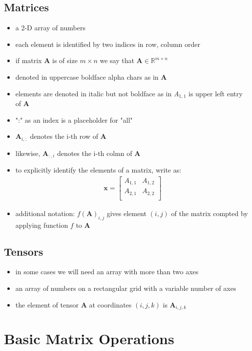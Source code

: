 \documentclass[11pt,twocolumn]{report}
\def\realnumbers{\mathbb{R}}
\begin{document}
\subsection{Matrices}
\begin{itemize}
  \item a 2-D array of numbers
  \item each element is identified by two indices in row, column order
  \item if matrix $\bm{A}$ is of size $m \times n$ we say that $\bm{A} \in
    \realnumbers^{m \times n}$
  \item denoted in uppercase boldface alpha chars as in $\bm{A}$
  \item elements are denoted in italic but not boldface as in
    \textit{A}$_{1,1}$ is upper left entry of $\bm{A}$
  \item ":" as an index is a placeholder for "all"
  \item $\bm{A}_{i,:}$ denotes the i-th row of $\bm{A}$
  \item likewise, $\bm{A}_{:,i}$ denotes the i-th colmn of $\bm{A}$
  \item to explicitly identify the elements of a matrix, write as:
    \begin{gather}
      \bm{x} = 
      \begin{bmatrix}
        A_{1,1} & A_{1, 2}\\
        A_{2,1} & A_{2, 2}\\
      \end{bmatrix}
    \end{gather}
  \item additional notation: $f(\bm{A})_{i, j}$ gives element $(i, j)$ of the
    matrix compted by applying function $f$ to $\bm{A}$
\end{itemize}

\subsection{Tensors}
\begin{itemize}
  \item in some cases we will need an array with more than two axes
  \item an array of numbers on a rectangular grid with a variable number of axes
  \item the element of tensor $\bm{A}$ at coordinates $(i, j, k)$ is
    $\bm{A}_{i, j, k}$
\end{itemize}

\section{Basic Matrix Operations}
\end{document}
